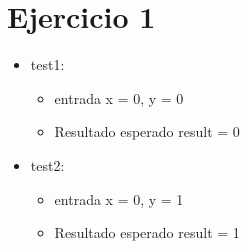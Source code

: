\documentclass{article}
\begin{document}
\section*{Ejercicio 1}



\begin{itemize}
    \item test1:
        \begin{itemize}
            \item entrada x = 0, y = 0
            \item Resultado esperado result = 0
        \end{itemize}
    \item test2:
        \begin{itemize}
            \item entrada x = 0, y = 1
            \item Resultado esperado result = 1
        \end{itemize}
\end{itemize}
\end{document}
